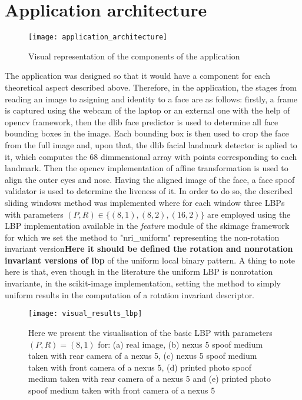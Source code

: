 \section{Application architecture}
\begin{figure}[H]
	\captionsetup{width=15cm,font=small}
	\begin{center}
		\texttt{[image: application\_architecture]}
	\end{center}
	\caption[Application architecure]{Visual representation of the components of the application}
	\label{fig:application_architecture}
\end{figure}
The application was designed so that it would have a component for each theoretical aspect described above. Therefore, in the application, the stages from reading an image to asigning and identity to a face are as follows: firstly, a frame is captured using the webcam of the laptop or an external one with the help of opencv framework, then the dlib \cite{dlib09} face predictor is used to determine all face bounding boxes in the image. 
Each bounding box is then used to crop the face from the full image and, upon that, the dlib facial landmark detector is aplied to it, which computes the 68 dimmensional array with points corresponding to each landmark. 
Then the opencv implementation of affine transformation is used to align the outer eyes and nose. Having the aligned image of the face, a face spoof validator is used to determine the liveness of it. 
In order to do so, the described sliding windows method was implemented where for each window three LBPs with parameters $(P,R) \in \{(8,1), (8,2), (16,2)\}$ are employed using the LBP implementation available in the \textit{feature} module of the skimage \cite{scikit-image} framework for which we set the method to "nri\_uniform" representing the non-rotation invariant version\textbf{Here it should be defined the rotation and nonrotation invariant versions of lbp} of the uniform local binary pattern. A thing to note here is that, even though in the literature the uniform LBP is nonrotation invariante, in the scikit-image \cite{scikit-image} implementation, setting the method to simply uniform results in the computation of a rotation invariant descriptor. 
\begin{figure}[H]
	\captionsetup{width=15cm,font=small}
	\begin{center}
		\texttt{[image: visual\_results\_lbp]}
	\end{center}
	\caption[LBP feature visualisation on faces]{Here we present the visualisation of the basic LBP with parameters $(P,R) = (8,1)$ for: (a) real image, (b) nexus 5 spoof medium taken with rear camera of a nexus 5, (c) nexus 5 spoof medium taken with front camera of a nexus 5, (d) printed photo spoof medium taken with rear camera of a nexus 5 and (e) printed photo spoof medium taken with front camera of a nexus 5}
	\label{fig:application_architecture}
\end{figure}
